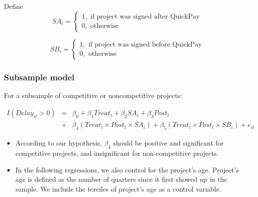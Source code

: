 \documentclass[
]{article}
\begin{document}
Define
\[ SA_i = \begin{cases} 1, \text{ if project was signed after QuickPay}\\
0, \text{ otherwise} \end{cases}\]

\[ SB_i = \begin{cases} 1, \text{ if project was signed before QuickPay}\\
0, \text{ otherwise} \end{cases}\]

\hypertarget{subsample-model}{%
\subsubsection{Subsample model}\label{subsample-model}}

For a subsample of competitive or noncompetitive projects:

\[ \begin{aligned} I(Delay_{it}>0) &=& \beta_0 +\beta_1 Treat_i+ \beta_2 SA_i+ \beta_3 Post_t \\&+& \beta_4 (Treat_i \times Post_t \times SA_i )+\beta_5 (Treat_i \times Post_t \times SB_i )+e_{it} \end{aligned} \]

\begin{itemize}
\item
  According to our hypothesis, \(\beta_4\) should be positive and
  significant for competitive projects, and insignificant for
  non-competitive projects.
\item
  In the following regressions, we also control for the project's age.
  Project's age is defined as the number of quarters since it first
  showed up in the sample. We include the terciles of project's age as a
  control variable.
\end{itemize}
\end{document}
